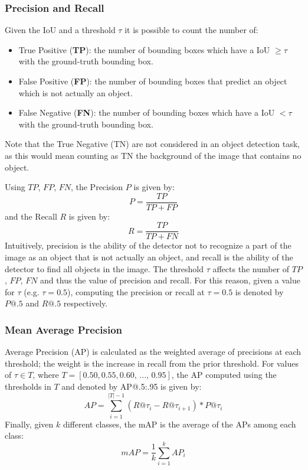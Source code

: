 \subsubsection{Precision and Recall}
Given the IoU and a threshold $\tau$ it is possible to count the number of:
\begin{itemize}
    \item True Positive (\textbf{TP}): the number of bounding boxes which have a IoU $\geq \tau$ with the ground-truth bounding box.
    \item False Positive (\textbf{FP}): the number of bounding boxes that predict an object which is not actually an object.
    \item False Negative (\textbf{FN}): the number of bounding boxes which have a IoU $< \tau$ with the ground-truth bounding box.
\end{itemize}
Note that the True Negative (TN) are not considered in an object detection task, as this would mean counting as TN the background of the image that contains no object.

Using $TP$, $FP$, $FN$, the Precision $P$ is given by:
\begin{equation} %
    P = \frac{TP}{TP + FP}
\end{equation}
and the Recall $R$ is given by:
\begin{equation} %
    R = \frac{TP}{TP + FN}
\end{equation}
Intuitively, precision is the ability of the detector not to recognize a part of the image as an object that is not actually an object, and recall is the ability of the detector to find all objects in the image.
The threshold $\tau$ affects the number of $TP$, $FP$, $FN$ and thus the value of precision and recall.
For this reason, given a value for $\tau$ (e.g. $\tau = 0.5$), computing the precision or recall at $\tau = 0.5$ is denoted by $P@.5$ and $R@.5$ respectively.

\subsubsection{Mean Average Precision}
Average Precision (AP) is calculated as the weighted average of precisions at each threshold; the weight is the increase in recall from the prior threshold. For values of $\tau \in T$, where $T = [0.50, 0.55, 0.60,\, ..., \, 0.95 ]$, the AP computed using the thresholds in $T$ and denoted by AP@.5:.95 is given by:
\begin{equation}
    AP = \sum_{i=1}^{|T| - 1}(R@\tau_i - R@\tau_{i+1} ) * P@\tau_{i}
\end{equation}
Finally, given $k$ different classes, the mAP is the average of the APs among each class:
\begin{equation}
    mAP = \frac{1}{k} \sum_{i=1}^{k} AP_i
\end{equation}

